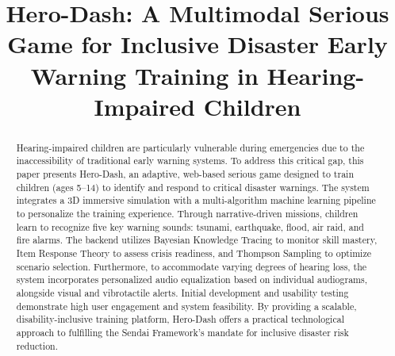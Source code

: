 \documentclass[conference]{IEEEtran}
\begin{document}
\title{Hero-Dash: A Multimodal Serious Game for Inclusive Disaster Early Warning Training in Hearing-Impaired Children\\
}

\author{
}

\maketitle

\begin{abstract}
Hearing-impaired children are particularly vulnerable during emergencies due to the inaccessibility of traditional early warning systems. To address this critical gap, this paper presents Hero-Dash, an adaptive, web-based serious game designed to train children (ages 5--14) to identify and respond to critical disaster warnings. The system integrates a 3D immersive simulation with a multi-algorithm machine learning pipeline to personalize the training experience. Through narrative-driven missions, children learn to recognize five key warning sounds: tsunami, earthquake, flood, air raid, and fire alarms. The backend utilizes Bayesian Knowledge Tracing to monitor skill mastery, Item Response Theory to assess crisis readiness, and Thompson Sampling to optimize scenario selection. Furthermore, to accommodate varying degrees of hearing loss, the system incorporates personalized audio equalization based on individual audiograms, alongside visual and vibrotactile alerts. Initial development and usability testing demonstrate high user engagement and system feasibility. By providing a scalable, disability-inclusive training platform, Hero-Dash offers a practical technological approach to fulfilling the Sendai Framework's mandate for inclusive disaster risk reduction.
\end{abstract}
\end{document}
